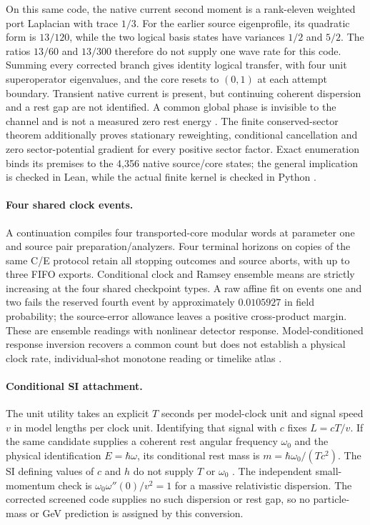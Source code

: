\documentclass[11pt]{article}
\theoremstyle{definition}
\theoremstyle{remark}
\theoremstyle{plain}
\begin{document}
On this same code, the native current second moment is a rank-eleven
weighted port Laplacian with trace $1/3$. For the earlier source eigenprofile,
its quadratic form is $13/120$, while the two logical basis states have
variances $1/2$ and $5/2$. The ratios $13/60$ and $13/300$ therefore do not
supply one wave rate for this code. Summing every corrected branch gives
identity logical transfer, with four unit superoperator eigenvalues, and
the core resets to $(0,1)$ at each attempt boundary. Transient native
current is present, but continuing coherent dispersion and a rest gap are
not identified. A common global phase is invisible to the channel and is
not a measured zero rest energy \cite{screenedTransport}. The finite
conserved-sector theorem additionally proves stationary reweighting,
conditional cancellation and zero sector-potential gradient for every
positive sector factor. Exact enumeration binds its premises to the 4,356
native source/core states; the general implication is checked in Lean,
while the actual finite kernel is checked in Python \cite{conservedSectorAction}.

\paragraph{Four shared clock events.}
A continuation compiles four transported-core modular words at parameter
one and source pair preparation/analyzers. Four terminal horizons on copies
of the same C/E protocol retain all stopping outcomes and source aborts,
with up to three FIFO exports. Conditional clock and Ramsey ensemble means
are strictly increasing at the four shared checkpoint types. A raw affine
fit on events one and two fails the reserved fourth event by approximately
$0.0105927$ in field probability; the source-error allowance leaves a
positive cross-product margin. These are ensemble readings with nonlinear
detector response. Model-conditioned response inversion recovers a common
count but does not establish a physical clock rate, individual-shot monotone
reading or timelike atlas \cite{sharedEventClock}.

\paragraph{Conditional SI attachment.}
The unit utility takes an explicit $T$ seconds per model-clock unit and
signal speed $v$ in model lengths per clock unit. Identifying that signal
with $c$ fixes $L=cT/v$. If the same candidate supplies a coherent rest
angular frequency $\omega_0$ and the physical identification
$E=\hbar\omega$, its conditional rest mass is
$m=\hbar\omega_0/(Tc^2)$. The SI defining values of $c$ and $h$ do not
supply $T$ or $\omega_0$ \cite{siConstants}. The independent small-momentum
check is $\omega_0\omega''(0)/v^2=1$ for a massive relativistic dispersion.
The corrected screened code supplies no such dispersion or rest gap, so
no particle-mass or GeV prediction is assigned by this conversion.
\end{document}
